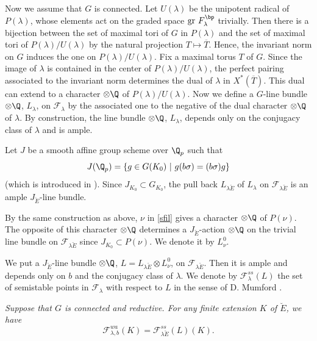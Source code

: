 \begin{apppara}
 Now we assume that $G$ is connected. Let $U(\lambda)$ be the unipotent
 radical of $P(\lambda)$, whose elements act on the graded space
 $\mathrm{gr}\ F_{\lambda}^{\bp}$ trivially. Then there is a bijection between
 the set of maximal tori of $G$ in $P(\lambda)$
 and the set of maximal tori
 of $P(\lambda)/U(\lambda)$ by the natural projection $T \mapsto \overline{T}$.
 Hence, the invariant norm on $G$ induces the one on $P(\lambda)/U(\lambda)$.
 Fix a maximal torus $T$ of $G$.
 Since the image of $\lambda$ is contained in the center of
 $P(\lambda)/U(\lambda)$,
 the perfect pairing associated to the invariant norm determines
 the dual of $\lambda$ in $X^*(\overline{T})$.
 This dual can extend to a character $\otimes \Q$ of
 $P(\lambda)/U(\lambda)$.
 Now we define a $G$-line bundle $\otimes \Q$, $L_\lambda$,
 on ${\mathcal F}_\lambda$
 by the associated one to the negative of the dual character $\otimes
 \Q$
 of $\lambda$. By construction, the line bundle ${\otimes \Q}$,
 $L_\lambda$, depends only on the conjugacy class of $\lambda$
 and is ample.

 Let $J$ be a smooth affine group scheme over $\Q_p$ such that
 $$
       J(\Q_p) = \{ g \in G(K_0) ~|~ g (b \sigma) = (b \sigma) g \}
 $$
 (which is introduced in \cite{psfpg}). 
 Since $J_{K_0} \subset G_{K_0}$, the pull back $L_{\lambda \breve{E}}$ 
 of $L_\lambda$ on ${\mathcal F}_{\lambda \breve{E}}$ 
 is an ample $J_{\breve{E}}$-line bundle. 

 By the same construction as above, $\nu$ in \ref{sfil} gives 
 a character $\otimes \Q$ of $P(\nu)$. 
 The opposite of this character $\otimes \Q$ 
 determines a $J_{\breve{E}}$-action $\otimes \Q$ 
 on the trivial line bundle on ${\mathcal F}_{\lambda \breve{E}}$ 
 since $J_{K_0} \subset P(\nu)$. We denote it by $L_\nu^0$. 

 We put a $J_{\breve{E}}$-line bundle ${\otimes \Q}$,
 $L = L_{\lambda \breve{E}} \otimes L_\nu^0$, 
on ${\mathcal F}_{\lambda \breve{E}}$. 
 Then it is ample and depends only on 
 $b$ and the conjugacy class of $\lambda$. 
 We denote by ${\mathcal F}_\lambda^{ss}(L)$ the set of semistable points 
 in ${\mathcal F}_\lambda$ 
 with respect to $L$ in the sense of D. Mumford \cite{git}. 
\end{apppara}

\begin{appthm}
 \cite{tpipht}
 {\it Suppose that $G$ is connected and reductive. 
 For any finite extension $K$ of $\breve{E}$, we have 
 $$
      {\mathcal F}_{\lambda, b}^{wa}(K) = {\mathcal F}_{\lambda 
 \breve{E}}^{ss}(L)(K). 
 $$
 }
\end{appthm}

